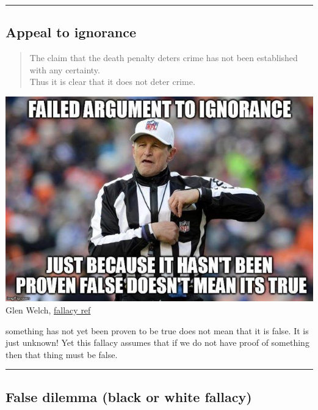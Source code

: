 \documentclass[justified]{tufte-book}
\newenvironment{argument}{\begin{quote}\normalsize}{\end{quote}}
\begin{document}
\begin{center}\rule{0.5\linewidth}{\linethickness}\end{center}

\hypertarget{appeal-to-ignorance}{%
\subsection*{Appeal to ignorance}\label{appeal-to-ignorance}}

\begin{argument}
The claim that the death penalty deters crime has not been established
with any certainty.\\
Thus it is clear that it does not deter crime.
\end{argument}

\begin{marginfigure}
\includegraphics{img/fallacies/ignorance.jpg}\\
Glen Welch, \href{https://twitter.com/fallacy_ref?lang=en}{fallacy ref}
\end{marginfigure}

 something has not yet been proven to be true does not mean that it is false. It is just unknown! Yet this fallacy assumes that if we do not have proof of something then that thing must be false.

\begin{center}\rule{0.5\linewidth}{\linethickness}\end{center}

\hypertarget{false-dilemma-black-or-white-fallacy}{%
\subsection*{False dilemma (black or white fallacy)}\label{false-dilemma-black-or-white-fallacy}}
\end{document}
